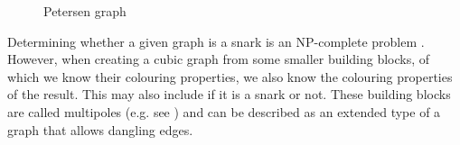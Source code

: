 \begin{figure}
	\centering
	
	\caption{Petersen graph}
	\label{fig:petersen}
\end{figure}

Determining whether a given graph is a snark is an NP-complete problem \cite{HolyerNP}. However, when creating a cubic graph from some smaller building blocks, of which we know their colouring properties, we also know the colouring properties of the result. This may also include if it is a snark or not. These building blocks are called multipoles (e.g. see \cite{Nedela1996}) and can be described as an extended type of a graph that allows dangling edges.



%


